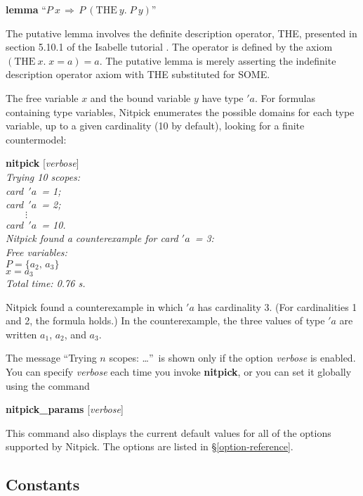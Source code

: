\documentclass[a4paper,12pt]{article}
\begin{document}
\prew
\textbf{lemma} ``$P~x\,\Longrightarrow\, P~(\textrm{THE}~y.\;P~y)$''
\postw
\pagebreak[2] %

The putative lemma involves the definite description operator, {THE}, presented
in section 5.10.1 of the Isabelle tutorial \cite{isa-tutorial}. The
operator is defined by the axiom $(\textrm{THE}~x.\; x = a) = a$. The putative
lemma is merely asserting the indefinite description operator axiom with {THE}
substituted for {SOME}.

The free variable $x$ and the bound variable $y$ have type $'a$. For formulas
containing type variables, Nitpick enumerates the possible domains for each type
variable, up to a given cardinality (10 by default), looking for a finite
countermodel:

\prew
\textbf{nitpick} [\textit{verbose}] \\[2\smallskipamount]
\slshape
Trying 10 scopes: \nopagebreak \\
\hbox{}\qquad \textit{card}~$'a$~= 1; \\
\hbox{}\qquad \textit{card}~$'a$~= 2; \\
\hbox{}\qquad $\qquad\vdots$ \\[.5\smallskipamount]
\hbox{}\qquad \textit{card}~$'a$~= 10. \\[2\smallskipamount]
Nitpick found a counterexample for \textit{card} $'a$~= 3: \\[2\smallskipamount]
\hbox{}\qquad Free variables: \nopagebreak \\
\hbox{}\qquad\qquad $P = \{a_2,\, a_3\}$ \\
\hbox{}\qquad\qquad $x = a_3$ \\[2\smallskipamount]
Total time: 0.76 s.
\postw

Nitpick found a counterexample in which $'a$ has cardinality 3. (For
cardinalities 1 and 2, the formula holds.) In the counterexample, the three
values of type $'a$ are written $a_1$, $a_2$, and $a_3$.

The message ``Trying $n$ scopes: {\ldots}''\ is shown only if the option
\textit{verbose} is enabled. You can specify \textit{verbose} each time you
invoke \textbf{nitpick}, or you can set it globally using the command

\prew
\textbf{nitpick\_params} [\textit{verbose}]
\postw

This command also displays the current default values for all of the options
supported by Nitpick. The options are listed in \S\ref{option-reference}.

\subsection{Constants}
\label{constants}
\end{document}
